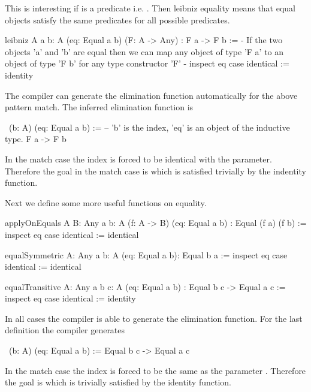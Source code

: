 This is interesting if  is a predicate i.e. .
Then leibniz equality means that equal objects satisfy the same predicates for
all possible predicates.

\begin{alba}
    leibniz
        {A} {a b: A}
        (eq: Equal a b)
        (F: A -> Any)
        : F a -> F b
    :=
        {- If the two objects 'a' and 'b' are equal then we can map any
           object of type 'F a' to an object of type 'F b' for any type
           constructor 'F'  -}
        inspect eq case
            identical := identity
\end{alba}

The compiler can generate the elimination function automatically for the above
pattern match. The inferred elimination function is
%
\begin{alba}
    \ (b: A) (eq: Equal a b) :=
            -- 'b' is the index, 'eq' is an object of the inductive type.
        F a -> F b
\end{alba}
%
In the match case  the index is forced to be identical with the
parameter. Therefore the goal in the match case is  which is
satisfied trivially by the indentity function.




Next we define some more useful functions on equality.
%
\begin{alba}
    applyOnEquals
        {A B: Any} {a b: A}
        (f: A -> B) (eq: Equal a b)
        : Equal (f a) (f b)
    :=
        inspect eq case
            identical := identical

    equalSymmetric
        {A: Any} {a b: A}
        (eq: Equal a b): Equal b a
    :=
        inspect eq case
            identical := identical

    equalTransitive
        {A: Any} {a b c: A}
        (eq: Equal a b)
        : Equal b c -> Equal a c
    :=
        inspect eq case
            identical := identity
\end{alba}


In all cases the compiler is able to generate the elimination function. For the
last definition the compiler generates
%
\begin{alba}
    \ (b: A) (eq: Equal a b) :=
        Equal b c -> Equal a c
\end{alba}
%
In the match case the index  is forced to be the same as the parameter
. Therefore the goal is  which is trivially
satisfied by the identity function.






